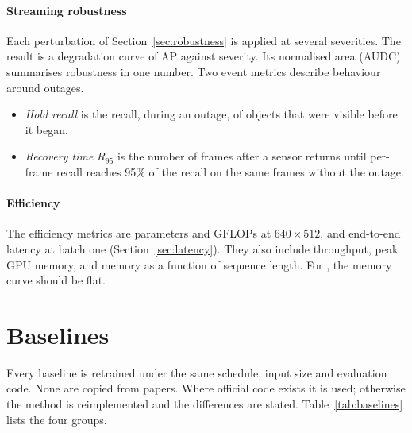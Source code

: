 \paragraph{Streaming robustness}
Each perturbation of Section~\ref{sec:robustness} is applied at several
severities. The result is a degradation curve of AP against severity. Its
normalised area (AUDC) summarises robustness in one number. Two event
metrics describe behaviour around outages.
\begin{itemize}
  \item \emph{Hold recall} is the recall, during an outage, of objects that
        were visible before it began.
  \item \emph{Recovery time} $R_{95}$ is the number of frames after a sensor
        returns until per-frame recall reaches 95\% of the recall on the
        same frames without the outage.
\end{itemize}

\paragraph{Efficiency}
The efficiency metrics are parameters and GFLOPs at $640\times512$, and
end-to-end latency at batch one (Section~\ref{sec:latency}). They also
include throughput, peak GPU memory, and memory as a function of sequence
length. For \methodS{}, the memory curve should be flat.

\section{Baselines}
\label{sec:baselines}

Every baseline is retrained under the same schedule, input size and
evaluation code. None are copied from papers. Where official code exists it
is used; otherwise the method is reimplemented and the differences are
stated. Table~\ref{tab:baselines} lists the four groups.


